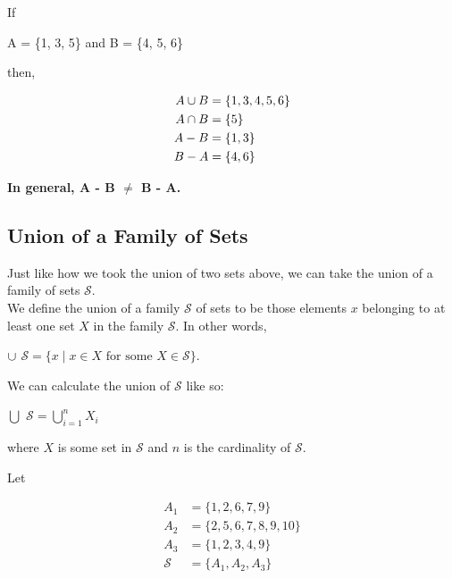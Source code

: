If

\begin{center}
A = \{1, 3, 5\} and B = \{4, 5, 6\}
\end{center}

then, 

\begin{align*}
    A \cup B &= \{1, 3, 4, 5, 6\}\\
    A \cap B &= \{5\}\\
    A - B &= \{1, 3\}\\
    B - A &= \{4, 6\}
\end{align*}

\textbf{In general, A - B $\neq$ B - A.}\\

\subsection*{Union of a Family of Sets}

Just like how we took the union of two sets above, we can take the union of a family of sets $\mathcal{S}$.\\

We define the union of a family $\mathcal{S}$ of sets to be those elements $x$ belonging to at least one set $X$ in the family $\mathcal{S}$.  In other words,

\begin{center}
    $\cup$ $\mathcal{S} = \{x \mid x \in X \text{ for some } X \in \mathcal{S}\}$.
\end{center}

We can calculate the union of $\mathcal{S}$ like so:

\begin{center}
    $\bigcup$ $\mathcal{S} = \bigcup\limits_{i=1}^{n} X_i$
\end{center}
\begin{center}
where $X$ is some set in $\mathcal{S}$ and $n$ is the cardinality of $\mathcal{S}$.
\end{center}

Let

\begin{align*}
    A_1 &= \{1, 2, 6, 7, 9\}\\
    A_2 &= \{2, 5, 6, 7, 8, 9, 10\}\\
    A_3 &= \{1, 2, 3, 4, 9\}\\
    \mathcal{S} &= \{A_1, A_2, A_3\}
\end{align*}

